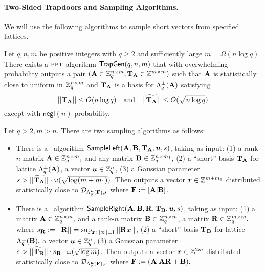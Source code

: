 \paragraph{Two-Sided Trapdoors and Sampling Algorithms.}

We will use the following algorithms to sample short vectors from specified lattices.

\begin{lemma} \label{lem:trapgen}
Let $q, n, m$ be positive integers with $q\geq 2$ and sufficiently large $m = \Omega(n \log q)$. There exists a $\textsc{ppt}$ algorithm $\mathsf{TrapGen}(q, n, m)$ that with overwhelming probability outputs a pair $(\mathbf{A}\in\mathbb{Z}_q^{n\times m}, \mathbf{T}_{\mathbf{A}} \in\mathbb{Z}^{m\times m})$ such that $\mathbf{A}$ is statistically close to uniform in $\mathbb{Z}_q^{n\times m}$ and $\mathbf{T}_{\mathbf{A}}$ is a basis for $\Lambda_q^{\bot}(\mathbf{A})$ satisfying
$$||\mathbf{T}_{\mathbf{A}}||\leq O(n\log q)\quad\mbox{and}\quad||\widetilde{\mathbf{T}_{\mathbf{A}}}||\leq O(\sqrt{n\log q})$$
except with $\mathsf{negl}(n)$ probability.
\end{lemma}

\begin{lemma} \label{lem:samp}
Let $q>2, m>n.$ There are two sampling algorithms as follows:
\begin{itemize}[leftmargin=*]
 \item There is a \ppt\ algorithm $\mathsf{SampleLeft}(\mathbf{A}, \mathbf{B}, \mathbf{T}_{\mathbf{A}}, \boldsymbol{u}, s)$, taking as input: (1) a rank-$n$ matrix $\mathbf{A}\in\mathbb{Z}_q^{n\times m},$ and any matrix $\mathbf{B}\in\mathbb{Z}_q^{n\times m_1}$, (2) a ``short'' basis $\mathbf{T}_{\mathbf{A}}$ for lattice $\Lambda_q^{\bot}(\mathbf{A})$, a vector $\boldsymbol{u}\in\mathbb{Z}_q^n$, (3) a Gaussian parameter $s > ||\widetilde{\mathbf{T}_{\mathbf{A}}}||\cdot\omega(\sqrt{\log(m+m_1)})$. Then outputs a vector $\boldsymbol{r}\in\mathbb{Z}^{m+m_1}$ distributed statistically close to $\mathcal{D}_{\Lambda_q^{\boldsymbol{u}}(\mathbf{F}), s}$ where $\mathbf{F}:=[\mathbf{A}|\mathbf{B}]$.

 \item There is a \ppt\ algorithm $\mathsf{SampleRight}(\mathbf{A}, \mathbf{B}, \mathbf{R}, \mathbf{T}_{\mathbf{B}}, \boldsymbol{u}, s)$, taking as input: (1) a matrix $\mathbf{A}\in\mathbb{Z}_q^{n \times m},$ and a rank-$n$ matrix $\mathbf{B}\in\mathbb{Z}_q^{n\times m}$, a matrix $\mathbf{R}\in\mathbb{Z}_q^{m \times m},$ where $s_{\mathbf{R}} := ||\mathbf{R}|| = \sup_{\boldsymbol{x} : ||\boldsymbol{x}||=1}||\mathbf{R}\boldsymbol{x}||$, (2) a ``short'' basis $\mathbf{T}_{\mathbf{B}}$ for lattice $\Lambda_q^{\bot}(\mathbf{B}),$ a vector $\boldsymbol{u}\in\mathbb{Z}_q^n$, (3) a Gaussian parameter $s > ||\widetilde{\mathbf{T}_{\mathbf{B}}}||\cdot{s_{\mathbf{R}}}\cdot\omega(\sqrt{\log{m}})$. Then outputs a vector $\boldsymbol{r}\in\mathbb{Z}^{2m}$ distributed statistically close to $\mathcal{D}_{\Lambda_q^{\boldsymbol{u}}(\mathbf{F}), s}$ where $\mathbf{F}:=(\mathbf{A}|\mathbf{A}\mathbf{R} + \mathbf{B}).$

\end{itemize}
\end{lemma}

